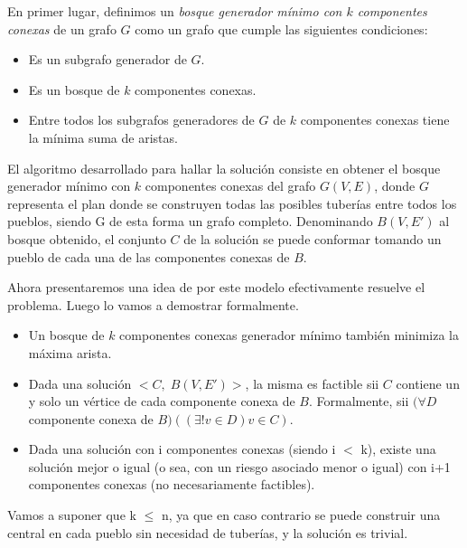 En primer lugar, definimos un \emph{bosque generador mínimo con $k$ componentes conexas} de un grafo $G$ como un grafo que cumple las siguientes condiciones:

\begin{itemize}
  \item Es un subgrafo generador de $G$.

  \item Es un bosque de $k$ componentes conexas.

  \item Entre todos los subgrafos generadores de $G$ de $k$ componentes conexas tiene la mínima suma de aristas.
\end{itemize}

El algoritmo desarrollado para hallar la solución consiste en obtener el bosque generador mínimo con $k$ componentes conexas del grafo $G(V,E)$, donde $G$ representa el plan donde se construyen todas las posibles tuberías entre todos los pueblos, siendo G de esta forma un grafo completo. Denominando $B(V,E')$ al bosque obtenido, el conjunto $C$ de la solución se puede conformar tomando un pueblo de cada una de las componentes conexas de $B$.

Ahora presentaremos una idea de por este modelo efectivamente resuelve el problema. Luego lo vamos a demostrar formalmente. 

\begin{itemize}
\item Un bosque de $k$ componentes conexas generador mínimo también minimiza la máxima arista.

\item Dada una solución $<C,\;B(V,E')>$, la misma es factible sii $C$ contiene un y solo un vértice de cada componente conexa de $B$. Formalmente, sii $(\forall D$ componente conexa de $B)((\exists ! v \in D) v \in C)$.  

\item Dada una solución con i componentes conexas (siendo i $<$ k), existe una solución mejor o igual (o sea, con un riesgo asociado menor o igual) con i+1 componentes conexas (no necesariamente factibles).
\end{itemize}

Vamos a suponer que k $\leq$ n, ya que en caso contrario se puede construir una central en cada pueblo sin necesidad de tuberías, y la solución es trivial.